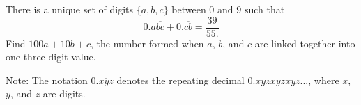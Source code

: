 There is a unique set of digits $\{a, b, c\}$ between $0$ and $9$ such that \[0.a\overline{bc} + 0.\overline{cb} = \dfrac{39}{55.}\]Find $100a+10b+c$, the number formed when $a$, $b$, and $c$ are linked together into one three-digit value.



Note: The notation $0.\overline{xyz}$ denotes the repeating decimal $0.xyzxyzxyz...$, where $x$, $y$, and $z$ are digits.
